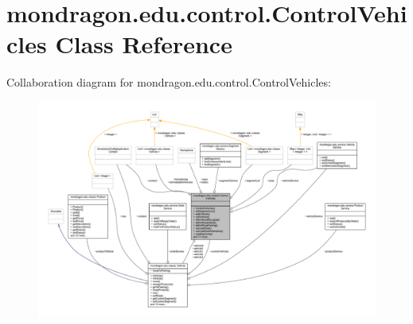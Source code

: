 \hypertarget{classmondragon_1_1edu_1_1control_1_1_control_vehicles}{}\section{mondragon.\+edu.\+control.\+Control\+Vehicles Class Reference}
\label{classmondragon_1_1edu_1_1control_1_1_control_vehicles}


Collaboration diagram for mondragon.\+edu.\+control.\+Control\+Vehicles\+:
\nopagebreak
\begin{figure}[H]
\begin{center}
\leavevmode
\includegraphics[width=350pt]{classmondragon_1_1edu_1_1control_1_1_control_vehicles__coll__graph}
\end{center}
\end{figure}
